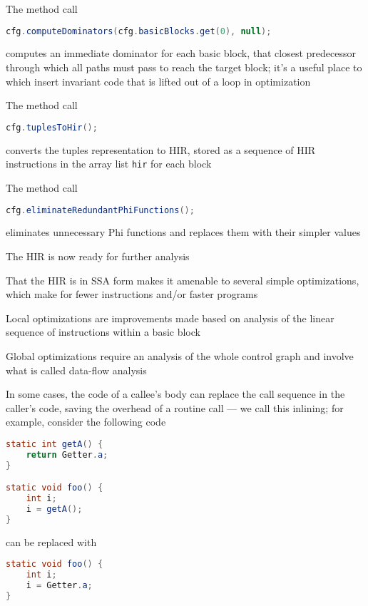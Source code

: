 \documentclass[8pt,a4paper,compress]{beamer}
\begin{document}
\begin{frame}[fragile]
\pause

The method call
\begin{lstlisting}[language=Java,style=focusin]
cfg.computeDominators(cfg.basicBlocks.get(0), null);
\end{lstlisting}
computes an immediate dominator for each basic block, that closest predecessor through which all paths must pass to reach the target block; it's a useful place to which insert invariant code that is lifted out of a loop in optimization

\pause
\bigskip

The method call
\begin{lstlisting}[language=Java,style=focusin]
cfg.tuplesToHir();
\end{lstlisting}
converts the tuples representation to HIR, stored as a sequence of HIR instructions in the array list \lstinline{hir} for each block

\pause
\bigskip

The method call
\begin{lstlisting}[language=Java,style=focusin]
cfg.eliminateRedundantPhiFunctions();
\end{lstlisting}
eliminates unnecessary Phi functions and replaces them with their simpler values

\pause
\bigskip

The HIR is now ready for further analysis
\end{frame}

\begin{frame}[fragile]
\pause

That the HIR is in SSA form makes it amenable to several simple optimizations, which make for fewer instructions and/or faster programs

\pause
\bigskip

Local optimizations are improvements made based on analysis of the linear sequence of instructions within a basic block

\pause
\bigskip

Global optimizations require an analysis of the whole control graph and involve what is called data-flow analysis

\pause
\bigskip

In some cases, the code of a callee's body can replace the call sequence in the caller's code, saving the overhead of a routine call --- we call this inlining; for example, consider the following code

\begin{lstlisting}[language=Java,style=focusin]
static int getA() {
    return Getter.a;
}

static void foo() {
    int i;
    i = getA();
}
\end{lstlisting}

can be replaced with

\begin{lstlisting}[language=Java,style=focusin]
static void foo() {
    int i;
    i = Getter.a;
}
\end{lstlisting}
\end{frame}
\end{document}
